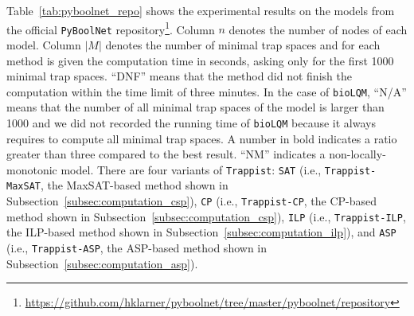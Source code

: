 \documentclass[preprint,12pt]{elsarticle}
\begin{document}
Table~\ref{tab:pyboolnet_repo} shows the experimental results on the models from the official \texttt{PyBoolNet} repository\footnote{\url{https://github.com/hklarner/pyboolnet/tree/master/pyboolnet/repository}}.
Column \(n\) denotes the number of nodes of each model.
Column \(|M|\) denotes the number of minimal trap spaces and for each method is given the computation time in seconds, asking only for the first 1000 minimal trap spaces.
``DNF'' means that the method did not finish the computation within the time limit of three minutes.
In the case of \texttt{bioLQM}, ``N/A'' means that the number of all minimal trap spaces of the model is larger than 1000 and we did not recorded the running time of \texttt{bioLQM} because it always requires to compute all minimal trap spaces.
A number in bold indicates a ratio greater than three compared to the best result.
``NM'' indicates a non-locally-monotonic model.
There are four variants of \texttt{Trappist}: \texttt{SAT} (i.e., \texttt{Trappist-MaxSAT}, the MaxSAT-based method shown in Subsection~\ref{subsec:computation_csp}), \texttt{CP} (i.e., \texttt{Trappist-CP}, the CP-based method shown in Subsection~\ref{subsec:computation_csp}), \texttt{ILP} (i.e., \texttt{Trappist-ILP}, the ILP-based method shown in Subsection~\ref{subsec:computation_ilp}), and \texttt{ASP} (i.e., \texttt{Trappist-ASP}, the ASP-based method shown in Subsection~\ref{subsec:computation_asp}).
\end{document}
